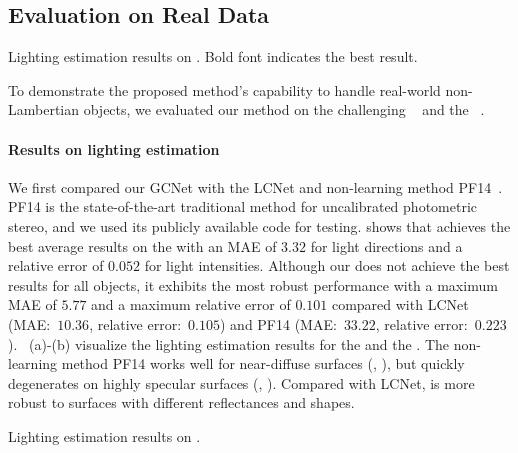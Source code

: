 \subsection{Evaluation on Real Data}
\begin{table}[htbp] \centering
    \caption[Lighting estimation results on \diligent]{Lighting estimation results on \diligent. Bold font indicates the best result.} %
     \label{tab:quant_light_diligent}
\end{table}

To demonstrate the proposed method's capability to handle real-world non-Lambertian objects, we evaluated our method on the challenging \emph{\diligent}~\cite{shi2019benchmark} and the \emph{\lightstage}~\cite{einarsson2006relighting}.

\paragraph{Results on lighting estimation}
We first compared our GCNet with the LCNet and non-learning method PF14~\cite{papad14closed}. 
PF14 is the state-of-the-art traditional method for uncalibrated photometric stereo, and we used its publicly available code for testing.
 shows that \gcnetacronym achieves the best average results on the \diligent with an MAE of $3.32$ for light directions and a relative error of $0.052$ for light intensities. 
Although our \gcnetacronym does not achieve the best results for all objects, it exhibits the most robust performance with a maximum MAE of $5.77$ and a maximum relative error of $0.101$ compared with LCNet (MAE:~$10.36$, relative error:~$0.105$) and PF14 (MAE:~$33.22$, relative error:~$0.223$).
~(a)-(b) visualize the lighting estimation results for the  and the . The non-learning method PF14 works well for near-diffuse surfaces (\eg, ), but quickly degenerates on highly specular surfaces (\eg, ). Compared with LCNet, \gcnetacronym is more robust to surfaces with different reflectances and shapes.

\begin{table}[tbp] \centering%
    \caption[Lighting estimation results on \lightstage]{Lighting estimation results on \lightstage.}%
     \label{tab:quant_light_lightstage}
\end{table}

